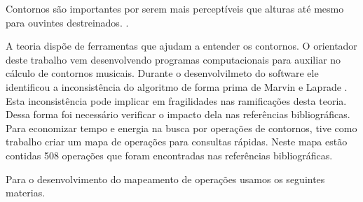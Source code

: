 \documentclass[11pt]{article}
\begin{document}
Contornos são importantes por serem mais perceptíveis que alturas
até mesmo para ouvintes destreinados.
\cite[p. 225]{Marvin1987}.

A teoria dispõe de ferramentas que ajudam a entender os contornos.
O orientador deste trabalho vem desenvolvendo programas computacionais para
auxiliar no cálculo de contornos musicais.
Durante o desenvolvilmeto do software ele identificou a
inconsistência do algoritmo de forma prima de Marvin e Laprade
\cite{Marvin1987}. Esta inconsistência pode implicar em fragilidades
nas ramificações desta teoria.
Dessa forma foi necessário verificar o
impacto dela nas referências bibliográficas.
Para economizar tempo e energia na busca por operações de contornos,
tive como trabalho criar um mapa de operações para consultas rápidas.
Neste mapa estão contidas 508 operações que foram
encontradas nas referências bibliográficas.

\label{sec:materiais}

Para o desenvolvimento do mapeamento de operações usamos os seguintes
materias.

\end{document}
